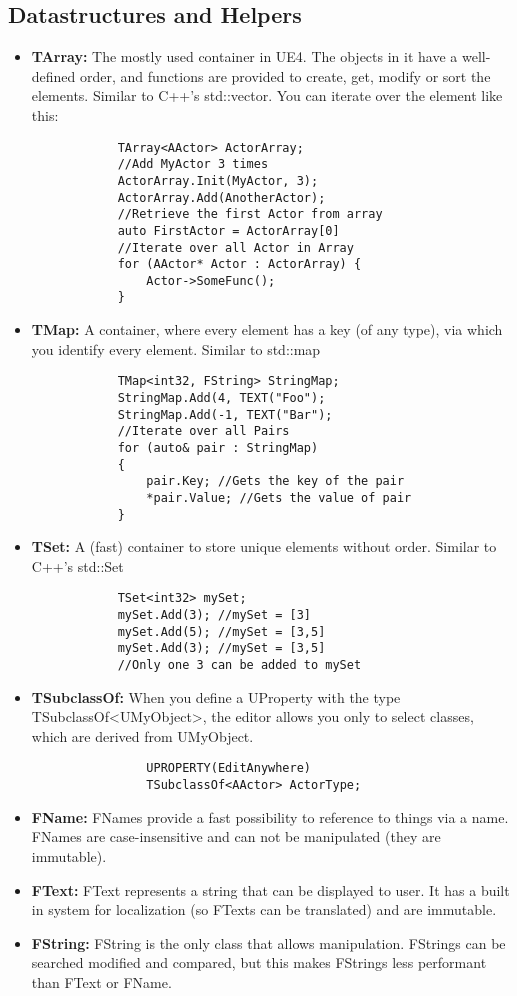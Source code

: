 \documentclass[10pt,a4paper]{article}
\begin{document}
\begin{multicols*}{2}
	\subsection{Datastructures and Helpers}
	\begin{itemize}
		\item \textbf{TArray:} The mostly used container in UE4. The objects in it have a well-defined order, and functions are provided to create, get, modify or sort the elements. Similar to C++'s std::vector. You can iterate over the element like this:
		\begin{verbatim}
			TArray<AActor> ActorArray;
			//Add MyActor 3 times
			ActorArray.Init(MyActor, 3);
			ActorArray.Add(AnotherActor);
			//Retrieve the first Actor from array
			auto FirstActor = ActorArray[0]
			//Iterate over all Actor in Array
			for (AActor* Actor : ActorArray) {
			    Actor->SomeFunc(); 
			}
		\end{verbatim}
		\item \textbf{TMap:} A container, where every element has a key (of any type), via which you identify every element. Similar to std::map
		\begin{verbatim}
			TMap<int32, FString> StringMap;
			StringMap.Add(4, TEXT("Foo");
			StringMap.Add(-1, TEXT("Bar");
			//Iterate over all Pairs
			for (auto& pair : StringMap)
			{
			    pair.Key; //Gets the key of the pair
			    *pair.Value; //Gets the value of pair
			}
		\end{verbatim}
		\item \textbf{TSet:} A (fast) container to store unique elements without order. Similar to C++'s std::Set
			\begin{verbatim}
			TSet<int32> mySet;
			mySet.Add(3); //mySet = [3]
			mySet.Add(5); //mySet = [3,5]
			mySet.Add(3); //mySet = [3,5]
			//Only one 3 can be added to mySet
			\end{verbatim}
		\item \textbf{TSubclassOf:} When you define a UProperty with the type TSubclassOf{\textless}UMyObject{\textgreater}, the editor allows you only to select classes, which are derived from UMyObject.
			\begin{verbatim}
				UPROPERTY(EditAnywhere)
				TSubclassOf<AActor> ActorType;
			\end{verbatim}
		\item \textbf{FName:} FNames provide a fast possibility to reference to things via a name. FNames are case-insensitive and can not be manipulated (they are immutable).
		\item \textbf{FText:} FText represents a string that can be displayed to user. It has a built in system for localization (so FTexts can be translated) and are immutable.
		\item \textbf{FString:} FString is the only class that allows manipulation. FStrings can be searched modified and compared, but this makes FStrings less performant than FText or FName.
	\end{itemize}


\end{multicols*}
\end{document}
